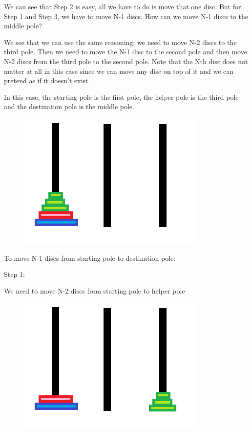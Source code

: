 \documentclass[11pt,oneside]{book}
\makeatletter
\def\maxwidth#1{\ifdim\Gin@nat@width>#1 #1\else\Gin@nat@width\fi}
\makeatother
\begin{document}
We can see that Step 2 is easy, all we have to do is move that one disc. But for Step 1 and Step 3, we have to move N-1 discs. How can we move N-1 discs to the middle pole?

We see that we can use the same reasoning: we need to move N-2 discs to the third pole. Then we need to move the N-1 disc to the second pole and then move N-2 discs from the third pole to the second pole. Note that the Nth disc does not matter at all in this case since we can move any disc on top of it and we can pretend as if it doesn't exist.

In this case, the starting pole is the first pole, the helper pole is the third pole and the destination pole is the middle pole.

\vspace{5px}\begin{figure}[H]\centering
        \includegraphics[width=0.66\maxwidth{\textwidth}]{hanoi.png}
        \end{figure}

To move N-1 discs from starting pole to destination pole:

Step 1:

We need to move N-2 discs from starting pole to helper pole

\vspace{5px}\begin{figure}[H]\centering
        \includegraphics[width=0.66\maxwidth{\textwidth}]{hanoi5.png}
        \end{figure}
\end{document}
